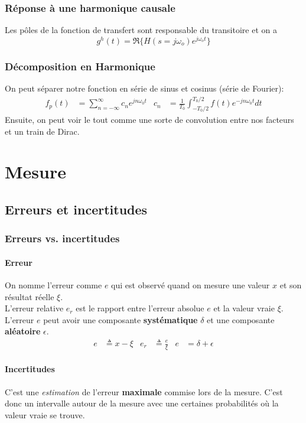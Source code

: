 \documentclass{report}
\begin{document}
\subsection{Réponse à une harmonique causale}
Les pôles de la fonction de transfert sont responsable du transitoire et on a
\begin{equation}
g^h (t) = \mathfrak{R} \{H(s = j \omega_o) e^{j \omega_o t}\}
\end{equation}

\subsection{Décomposition en Harmonique}
On peut séparer notre fonction en série de sinus et cosinus (série de Fourier):
\begin{align*}
f_p (t) &= \sum_{n = - \infty}^{\infty} c_n e^{j n \omega_0 t} & c_n &= \frac{1}{T_0} \int_{- T_0 / 2}^{T_0 / 2} f(t) e^{-j n \omega_0 t} dt
\end{align*}
Ensuite, on peut voir le tout comme une sorte de convolution entre nos facteurs et un train de Dirac.


\chapter{Mesure}
\section{Erreurs et incertitudes}
\subsection{Erreurs vs. incertitudes}
\subsubsection{Erreur}
On nomme l'erreur comme $e$ qui est observé quand on mesure une valeur $x$ et son résultat réelle $\xi$.\\
L'erreur relative $e_r$ est le rapport entre l'erreur absolue $e$ et la valeur vraie $\xi$.\\ 
L'erreur $e$ peut avoir une composante \textbf{systématique} $\delta$ et une composante \textbf{aléatoire} $\epsilon$.
\begin{align} \label{eq:erreur}
e &\triangleq  x - \xi & e_r &\triangleq \frac{e}{\xi} & e &= \delta + \epsilon 
\end{align}

\subsubsection{Incertitudes}
C'est une \textit{estimation} de l'erreur \textbf{maximale} commise lors de la mesure. C'est donc un intervalle autour de la mesure avec une certaines probabilités où la valeur vraie se trouve. 
\end{document}

